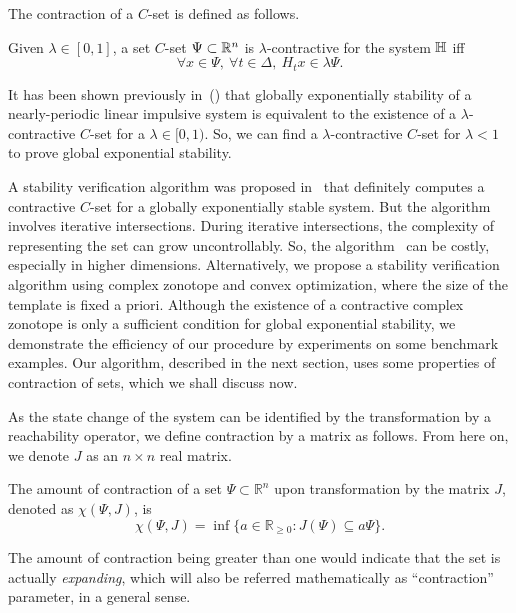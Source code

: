 The contraction of a $C$-set is defined as follows.
%
\begin{definition}
Given $\lambda\in[0,1]$, a set $C$-set $\Psi\subset\mathbb{R}^n$ is
$\lambda$-contractive for the system $\mathbb{H}$ iff
\[\forall x\in\Psi,~\forall t\in\Delta,~H_tx\in\lambda\Psi.\]
\end{definition}
%
\begin{remark} It has been shown previously
in~(\cite{2014-fiacchini-set,athanasopoulos2014alternative,AlKhatib2015})
that globally exponentially stability of a nearly-periodic linear
impulsive system is equivalent to the existence of a
$\lambda$-contractive $C$-set for a $\lambda\in[0,1)$.  So, we can
  find a $\lambda$-contractive $C$-set for $\lambda<1$ to prove  global
  exponential stability.
\end{remark}
%
  A stability verification algorithm was proposed
  in~\cite{2014-fiacchini-set} that definitely computes a contractive
  $C$-set for a globally exponentially stable system.  But the
  algorithm involves iterative intersections.  During iterative
  intersections, the complexity of representing the set can grow
  uncontrollably.  So, the
  algorithm~\cite{2014-fiacchini-set} can be costly, especially in
  higher dimensions.  Alternatively, we propose a stability
  verification algorithm using complex zonotope and convex
  optimization, where the size of the template is fixed a priori.
  Although the existence of a contractive complex zonotope is only a
  sufficient condition for global exponential stability, we demonstrate
  the efficiency of our procedure by experiments on some benchmark
  examples.  Our algorithm, described in the next section, uses some
  properties of contraction of sets, which we shall discuss now.

As the state change of the system can be identified by the
transformation by a reachability operator, we define contraction by
a matrix as follows.  From here on, we denote $J$ as an
$n\times n$ real matrix.
%
\begin{defn} The amount of contraction of a set
  $\Psi\subset\mathbb{R}^n$ upon transformation by the matrix $J$,
  denoted as $\chi(\Psi,J)$, is $$\chi(\Psi,J) =
  \inf\{a\in\mathbb{R}_{\geq 0} : J(\Psi)\subseteq a
  \Psi\}.$$ \end{defn}
The amount of contraction being greater than one would indicate that
the set is actually \emph{expanding}, which will also be referred
mathematically as ``contraction'' parameter, in a general sense.
%


